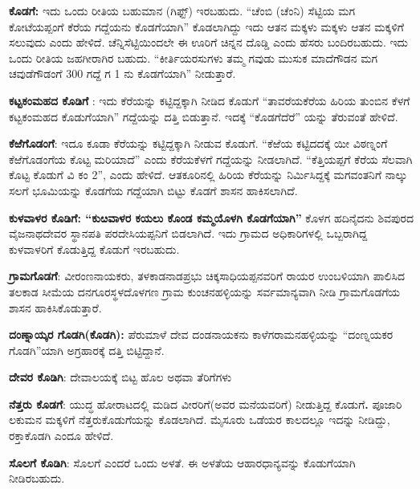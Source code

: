 \textbf{ಕೊಡಗೆ: } ಇದು ಒಂದು ರೀತಿಯ ಬಹುಮಾನ (ಗಿಫ್ಟ್​) ಇರಬಹುದು.\textbf{ }“ಚೆಂಬಿ (ಚೆಂನಿ) ಸೆಟ್ಟಿಯ ಮಗ ಕೋಟೆಯಪ್ಪಂಗೆ ಕೆರೆಯ ಗದ್ದೆಯನು ಕೊಡಗೆಯಾಗಿ” ಕೊಡಲಾಗಿದ್ದು ಇದು ಆತನ ಮಕ್ಕಳು ಮಕ್ಕಳು ಆತನ ಮಕ್ಕಳಿಗೆ ಸಲುವುದು ಎಂದು ಹೇಳಿದೆ. ಚೆನ್ನಿಸೆಟ್ಟಿಯಿಂದಲೇ ಈ ಊರಿಗೆ ಚಿನ್ನನ ದೊಡ್ಡಿ ಎಂದು ಹೆಸರು ಬಂದಿರಬಹುದು. ಇದು ಒಂದು ರೀತಿಯ ಜಹಗೀರಾಗಿರ ಬಹುದು. “ಕೀರ್ತಿಯರಸುಗಳು ತಮ್ಮ ಗವುಡು ಮುಸುಕ ಮಾದೆಗೌಡನ ಮಗ ಚವುಡೆಗೌಡಂಗೆ 300 ಗದ್ದೆ ಗ 1 ನು ಕೊಡಗೆಯಾಗಿ” ನೀಡುತ್ತಾರೆ.

\textbf{ಕಟ್ಟಕಂಮಹದ ಕೊಡಿಗೆ} : ಇದು ಕೆರೆಯನ್ನು ಕಟ್ಟಿದ್ದಕ್ಕಾಗಿ ನೀಡಿದ ಕೊಡುಗೆ “ತಾವರೆಯಕೆರೆಯ ಹಿರಿಯ ತುಂಬಿನ ಕೆಳಗೆ ಕಟ್ಟಕಂಮಹದ ಕೊಡುಗೆಯಾಗಿ” ಗದ್ದೆಯನ್ನು ದತ್ತಿ ಬಿಡುತ್ತಾನೆ. ಇದಕ್ಕೆ “ಕೊಡಗೆದೆರೆ” ಯನ್ನು ತೆರುವಂತೆ ಹೇಳಿದೆ.

\textbf{ಕೆಱೆಗೊಡಂಗೆ}: ಇದೂ ಕೂಡಾ ಕೆರೆಯನ್ನು ಕಟ್ಟಿದ್ದಕ್ಕಾಗಿ ನೀಡುವ ಕೊಡುಗೆ. “ಕೆಱೆಯ ಕಟ್ಟಿದದಕ್ಕೆ ಯೀ ವಿಠಣ್ನಂಗೆ ಕೆಱೆಗೊಡಂಗೆಯ ಕೊಟ್ಟ ಮರಿಯಾದೆ” ಎಂದು ಕೆರೆಯಕೆಳಗೆ ಗದ್ದೆಯನ್ನು ನೀಡಲಾಗಿದೆ. “ಕೆತ್ತಿಯಪ್ಪಗೆ ಕೆರೆಯ ಸೆಲವಾಗಿ ಕೊಟ್ಟ ಕೊಡುಗೆ ವಿ ಕಂ 2”, ಎಂದು ಹೇಳಿದೆ. ಆತಕೂರಿನಲ್ಲಿ ಹಿರಿಯ ಕೆರೆಯನ್ನು ನಿರ್ಮಿಸಿದ್ದಕ್ಕೆ ಮಗವಂತನಿಗೆ ನಾಲ್ಕು ಸಲಗೆ ಭೂಮಿಯನ್ನು ಕೊಡಗೆಯ ಗದ್ದೆಯಾಗಿ ಬಿಟ್ಟು ಕೊಡಗೆ ಶಾಸನ ಹಾಕಿಸಲಾಗಿದೆ.

\textbf{ಕುಳವಾಳರ ಕೊಡಿಗೆ: “ಕುೞವಾಳರ ಕಯಲು ಕೊಂಡ ಕಮ್ಮಯೊಳಗಿ ಕೊಡಗೆಯಾಗಿ”} ಕೊಳಗ ಹದಿನೈದನು ಶಿವಪುರದ ವೈಜನಾಥದೇವರ ಸ್ಥಾನಪತಿ ಪರದೇಸಿಯಪ್ಪನಿಗೆ ಬಿಡಲಾಗಿದೆ. ಇದು ಗ್ರಾಮದ ಅಧಿಕಾರಿಗಳಲ್ಲಿ ಒಬ್ಬರಾಗಿದ್ದ ಕುಳವಾಳರಿಗೆ ಕೊಡುತ್ತಿದ್ದ ಕೊಡುಗೆ ಇರಬಹುದು. 

\textbf{ಗ್ರಾಮಗೊಡಗೆ}: ವೀರಂಣನಾಯಕರು, ತಳಕಾಡನಾಡಪ್ರಭು ಚಿಕ್ಕಸಾಧಿಯಪ್ಪನವರಿಗೆ ರಾಯರ ಉಂಬಳಿಯಾಗಿ ಪಾಲಿಸಿದ ತಲಕಾಡ ಸೀಮೆಯ ದನಗೂರಸ್ಥಳದೊಳಗಣ ಗ್ರಾಮ ಕುಂಚನಹಳ್ಳಿಯನ್ನು ಸರ್ವಮಾನ್ಯವಾಗಿ ನೀಡಿ ಗ್ರಾಮಗೊಡಗೆಯ ಶಾಸನ ಹಾಕಿಸಿಕೊಡುತ್ತಾರೆ.

\textbf{ದಂಣ್ನಾಯ್ಕರ ಗೊಡಗಿ(ಕೊಡಗಿ):} ಪೆರುಮಾಳೆ ದೇವ ದಂಡನಾಯಕನು ಕಾಳೆಗರಾಮನಹಳ್ಳಿಯನ್ನು “ದಂಣ್ನಯಕರ ಗೊಡಗಿ”ಯಾಗಿ ಅಗ್ರಹಾರಕ್ಕೆ ದತ್ತಿ ಬಿಟ್ಟಿದ್ದಾನೆ.

\textbf{ದೇವರ ಕೊಡಿಗಿ}: ದೇವಾಲಯಕ್ಕೆ ಬಿಟ್ಟ ಹೊಲ ಅಥವಾ ತೆರಿಗೆಗಳು

\textbf{ನೆತ್ತರು ಕೊಡಗೆ}: ಯುದ್ಧ ಹೋರಾಟದಲ್ಲಿ ಮಡಿದ ವೀರರಿಗೆ(ಅವರ ಮನೆಯವರಿಗೆ) ನೀಡುತ್ತಿದ್ದ ಕೊಡುಗೆ\textbf{.\general{\break } }ಪೂಜಾರಿ ಲಕುಮನ ಮಕ್ಕಳಿಗೆ ನೆತ್ತರುಕೊಡುಗೆಯನ್ನು ಕೊಡಲಾಗಿದೆ. ಮೈಸೂರು ಒಡೆಯರ ಕಾಲದಲ್ಲೂ ಇದನ್ನು ನೀಡಿದ್ದು, ರಕ್ತಾಕೊಡಗಿ ಎಂದೂ ಹೇಳಿದೆ. 

\textbf{ಸೊಲಗೆ ಕೊಡಿಗಿ}: ಸೊಲಗೆ ಎಂದರೆ ಒಂದು ಅಳತೆ. ಈ ಅಳತೆಯ ಆಹಾರಧಾನ್ಯವನ್ನು ಕೊಡುಗೆಯಾಗಿ ನೀಡಿರಬಹುದು.


